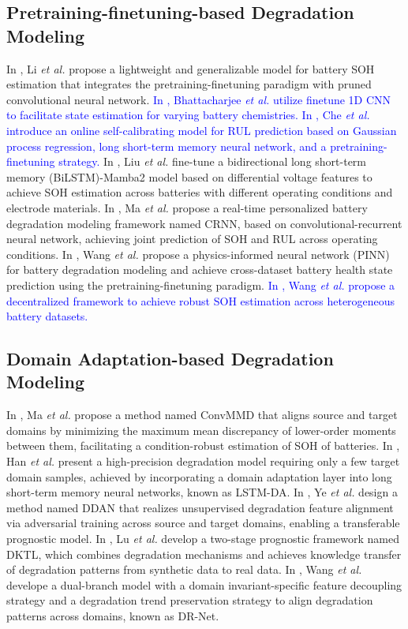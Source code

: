 \documentclass[lettersize,journal]{IEEEtran}
\newcommand{\rev}[1]{\textcolor{blue}{#1}}
\begin{document}
\subsection{Pretraining-finetuning-based Degradation Modeling}

In \cite{LI2021116410}, Li \emph{et al.} propose a lightweight and generalizable model for battery SOH estimation that integrates the pretraining-finetuning paradigm with pruned convolutional neural network.
\rev{In \cite{9372902}, Bhattacharjee \emph{et al.} utilize finetune 1D CNN to facilitate state estimation for varying battery chemistries.}
\rev{In \cite{9343713}, Che \emph{et al.} introduce an online self-calibrating model for RUL prediction based on Gaussian process regression, long short-term memory neural network, and a pretraining-finetuning strategy.}
In \cite{LIU2025115347}, Liu \emph{et al.} fine-tune a bidirectional long short-term memory (BiLSTM)-Mamba2 model based on differential voltage features to achieve SOH estimation across batteries with different operating conditions and electrode materials.
In \cite{D2EE01676A}, Ma \emph{et al.} propose a real-time personalized battery degradation modeling framework named CRNN, based on convolutional-recurrent neural network, achieving joint prediction of SOH and RUL across operating conditions.
In \cite{wang2024physics}, Wang \emph{et al.} propose a physics-informed neural network (PINN) for battery degradation modeling and achieve cross-dataset battery health state prediction using the pretraining-finetuning paradigm.
\rev{In \cite{10886998}, Wang \emph{et al.} propose a decentralized framework to achieve robust SOH estimation across heterogeneous battery datasets.}

\subsection{Domain Adaptation-based Degradation Modeling}

In \cite{9788003}, Ma \emph{et al.} propose a method named ConvMMD that aligns source and target domains by minimizing the maximum mean discrepancy of lower-order moments between them, facilitating a condition-robust estimation of SOH of batteries.
In \cite{HAN2022230823}, Han \emph{et al.} present a high-precision degradation model requiring only a few target domain samples, achieved by incorporating a domain adaptation layer into long short-term memory neural networks, known as LSTM-DA.  
In \cite{9560040}, Ye \emph{et al.} design a method named DDAN that realizes unsupervised degradation feature alignment via adversarial training across source and target domains, enabling a transferable prognostic model.
In \cite{10029904}, Lu \emph{et al.} develop a two-stage prognostic framework named DKTL, which combines degradation mechanisms and achieves knowledge transfer of degradation patterns from synthetic data to real data.
In \cite{WANG2023108897}, Wang \emph{et al.} develope a dual-branch model with a domain invariant-specific feature decoupling strategy and a degradation trend preservation strategy to align degradation patterns across domains, known as DR-Net.
\end{document}
